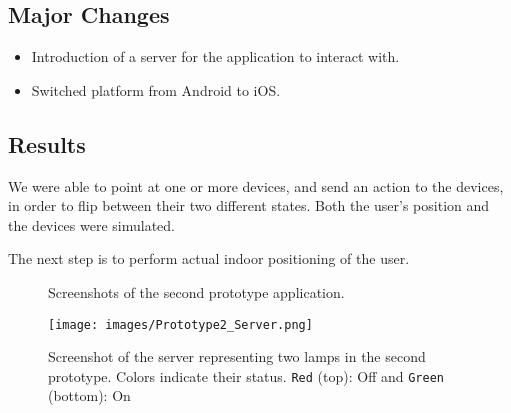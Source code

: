 \subsection{Major Changes}
\begin{itemize}
    \item Introduction of a server for the application to interact with.
    \item Switched platform from Android to iOS.
\end{itemize}

\subsection{Results}

We were able to point at one or more devices,
and send an action to the devices, 
in order to flip between their two different states. 
Both the user's position and the devices were simulated.

The next step is to perform actual indoor positioning of the user.

\begin{figure}[!htb]%
    \centering
    \caption{Screenshots of the second prototype application.}
    \label{fig:prototype2-app-screenshots}
\end{figure}

\begin{figure}[!htb]
    \centering
    \texttt{[image: images/Prototype2\_Server.png]}
    \caption{Screenshot of the server representing two lamps in the second prototype. Colors indicate their status. \texttt{Red} (top): Off and \texttt{Green} (bottom): On}
    \label{fig:prototype2-server-screenshot}
\end{figure}


